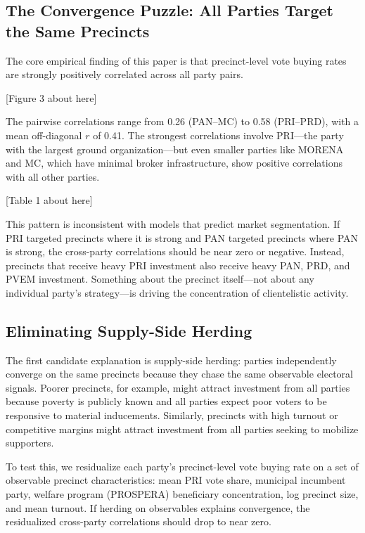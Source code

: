 \documentclass[12pt,letterpaper]{article}
\begin{document}
\subsection{The Convergence Puzzle: All Parties Target the Same Precincts}

The core empirical finding of this paper is that precinct-level vote buying rates are strongly positively correlated across all party pairs.

[Figure 3 about here]

The pairwise correlations range from 0.26 (PAN--MC) to 0.58 (PRI--PRD), with a mean off-diagonal $r$ of 0.41. The strongest correlations involve PRI---the party with the largest ground organization---but even smaller parties like MORENA and MC, which have minimal broker infrastructure, show positive correlations with all other parties.

[Table 1 about here]

This pattern is inconsistent with models that predict market segmentation. If PRI targeted precincts where it is strong and PAN targeted precincts where PAN is strong, the cross-party correlations should be near zero or negative. Instead, precincts that receive heavy PRI investment also receive heavy PAN, PRD, and PVEM investment. Something about the precinct itself---not about any individual party's strategy---is driving the concentration of clientelistic activity.


\subsection{Eliminating Supply-Side Herding}

The first candidate explanation is supply-side herding: parties independently converge on the same precincts because they chase the same observable electoral signals. Poorer precincts, for example, might attract investment from all parties because poverty is publicly known and all parties expect poor voters to be responsive to material inducements. Similarly, precincts with high turnout or competitive margins might attract investment from all parties seeking to mobilize supporters.

To test this, we residualize each party's precinct-level vote buying rate on a set of observable precinct characteristics: mean PRI vote share, municipal incumbent party, welfare program (PROSPERA) beneficiary concentration, log precinct size, and mean turnout. If herding on observables explains convergence, the residualized cross-party correlations should drop to near zero.
\end{document}
